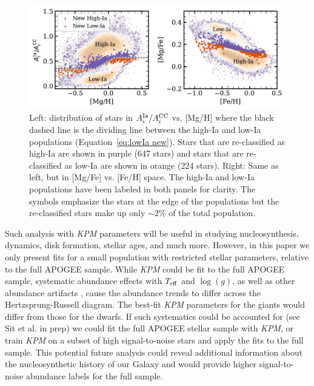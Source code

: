 \documentclass[modern]{aastex631}
\newcommand{\logg}{\log(g)}
\newcommand{\teff}{T_{\rm eff}}
\newcommand{\Acc}{A^{\rm CC}_{i}}
\newcommand{\AIa}{A^{\rm Ia}_{i}}
\newcommand{\name}{\textsl{KPM}}
\begin{document}
\begin{figure}[htb!]
    \centering
    \includegraphics[width=.9\textwidth]{pop_divis.pdf}
    \caption{Left: distribution of stars in $\AIa/\Acc$ vs. [Mg/H] where the black dashed line is the dividing line between the high-Ia and low-Ia populations (Equation~\ref{eq:lowIa new}). Stars that are re-classified as high-Ia are shown in purple (647 stars) and stars that are re-classified as low-Ia are shown in orange (224 stars). Right: Same as left, but in [Mg/Fe] vs. [Fe/H] space. The high-Ia and low-Ia populations have been labeled in both panels for clarity. The symbols emphasize the stars at the edge of the populations but the re-classified stars make up only $\sim 2\%$ of the total population.}
    \label{fig:pop_divis}
\end{figure}

Such analysis with \name{} parameters will be useful in studying nucleosynthesis, dynamics, disk formation, stellar ages, and much more. However, in this paper we only present fits for a small population with restricted stellar parameters, relative to the full APOGEE sample. 
While \name{} could be fit to the full APOGEE sample, systematic abundance effects with $\teff$ and $\logg$, as well as other abundance artifacts \citep[e.g.,][]{jonsson2020, griffith2021a}, cause the abundance trends to differ across the Hertzsprung-Russell diagram. The best-fit \name{} parameters for the giants would differ from those for the dwarfs. If such systematics could be accounted for (see Sit et al. in prep) we could fit the full APOGEE stellar sample with \name{}, or train \name{} on a subset of high signal-to-noise stars and apply the fits to the full sample. This potential future analysis could reveal additional information about the nucleosynthetic history of our Galaxy and would provide higher signal-to-noise abundance labels for the full sample.
\end{document}
